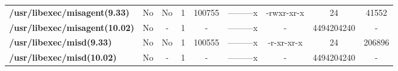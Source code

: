 \begin{center}
{\begin{tabular}{|>{\bfseries} l | C | C | C | C | C | C | C | C |}
					/usr/libexec/misagent(9.33) & No & No & \color{green}1 & \color{red}100755 & \color{green}---------x & \color{red}-rwxr-xr-x & \color{green}24 & \color{red}41552\\ 
					/usr/libexec/misagent(10.02) & No & - & 1 & - & ---------x & - & 4494204240 & -\\ 
					/usr/libexec/misd(9.33) & No & No & \color{green}1 & \color{red}100555 & \color{green}---------x & \color{red}-r-xr-xr-x & \color{green}24 & \color{red}206896\\ 
					/usr/libexec/misd(10.02) & No & - & 1 & - & ---------x & - & 4494204240 & -\\ 

			\end{tabular}
		}
	\end{center}



